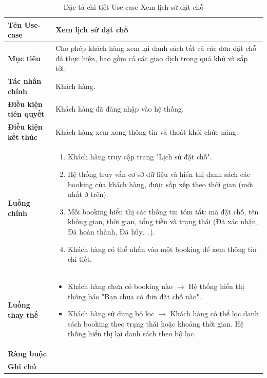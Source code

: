 \begin{table}[H]
\centering
\renewcommand{\arraystretch}{1.3}
\begin{tabular}{|p{4cm}|p{10cm}|}
\hline
\textbf{Tên Use-case} 
& Xem lịch sử đặt chỗ \\ 
\hline

\textbf{Mục tiêu} 
& Cho phép khách hàng xem lại danh sách tất cả các đơn đặt chỗ đã thực hiện, bao gồm cả các giao dịch trong quá khứ và sắp tới. \\ 
\hline

\textbf{Tác nhân chính} 
& Khách hàng. \\ 
\hline

\textbf{Điều kiện tiên quyết} 
& Khách hàng đã đăng nhập vào hệ thống. \\ 
\hline

\textbf{Điều kiện kết thúc} 
& Khách hàng xem xong thông tin và thoát khỏi chức năng. \\ 
\hline

\textbf{Luồng chính} 
& 
\begin{enumerate}
    \item Khách hàng truy cập trang "Lịch sử đặt chỗ".
    \item Hệ thống truy vấn cơ sở dữ liệu và hiển thị danh sách các booking của khách hàng, được sắp xếp theo thời gian (mới nhất ở trên).
    \item Mỗi booking hiển thị các thông tin tóm tắt: mã đặt chỗ, tên không gian, thời gian, tổng tiền và trạng thái (Đã xác nhận, Đã hoàn thành, Đã hủy,...).
    \item Khách hàng có thể nhấn vào một booking để xem thông tin chi tiết.
\end{enumerate} \\ 
\hline

\textbf{Luồng thay thế} 
& 
\begin{itemize}
    \item Khách hàng chưa có booking nào $\rightarrow$ Hệ thống hiển thị thông báo "Bạn chưa có đơn đặt chỗ nào".
    \item Khách hàng sử dụng bộ lọc $\rightarrow$ Khách hàng có thể lọc danh sách booking theo trạng thái hoặc khoảng thời gian. Hệ thống hiển thị lại danh sách theo bộ lọc.
\end{itemize} \\ 
\hline

\textbf{Ràng buộc} 
\\ 
\hline

\textbf{Ghi chú} 
\\ 
\hline
\end{tabular}
\caption{Đặc tả chi tiết Use-case Xem lịch sử đặt chỗ}
\label{tab:history-spec}
\end{table}

